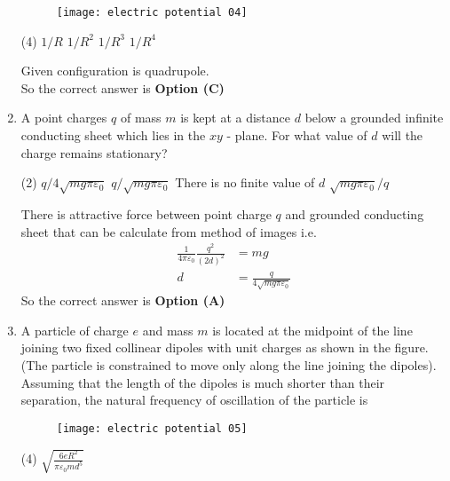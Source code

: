 \begin{enumerate}
	{}
	\begin{figure}[H]
		\centering
		\texttt{[image: electric potential 04]}
	\end{figure}
	\begin{tasks}(4)
		\task[\textbf{A.}] $1 / R$
		\task[\textbf{B.}] $1 / R^{2}$
		\task[\textbf{C.}] $1 / R^{3}$
		\task[\textbf{D.}] $1 / R^{4}$
	\end{tasks}
	\begin{answer}
		Given configuration is quadrupole.\\
		So the correct answer is \textbf{Option (C)}
	\end{answer}
	\item  A point charges $q$ of mass $m$ is kept at a distance $d$ below a grounded infinite conducting sheet which lies in the $x y$ - plane. For what value of $d$ will the charge remains stationary?
	{}
	\begin{tasks}(2)
		\task[\textbf{A.}] $q / 4 \sqrt{m g \pi \varepsilon_{0}}$
		\task[\textbf{B.}] $q / \sqrt{m g \pi \varepsilon_{0}}$
		\task[\textbf{C.}] There is no finite value of $d$
		\task[\textbf{D.}]  $\sqrt{m g \pi \varepsilon_{0}} / q$
	\end{tasks}
	\begin{answer}
		There is attractive force between point charge $q$ and grounded conducting sheet that can be calculate from method of images i.e.
		\begin{align*}
		\frac{1}{4 \pi \varepsilon_{0}} \frac{q^{2}}{(2 d)^{2}}&=m g \\ d&=\frac{q}{4 \sqrt{m g \pi \varepsilon_{0}}}
		\end{align*}
		So the correct answer is \textbf{Option (A)}
	\end{answer}
	\item A particle of charge $e$ and mass $m$ is located at the midpoint of the line joining two fixed collinear dipoles with unit charges as shown in the figure. (The particle is constrained to move only along the line joining the dipoles). Assuming that the length of the dipoles is much shorter than their separation, the natural frequency of oscillation of the particle is
	{}
	\begin{figure}[H]
		\centering
		\texttt{[image: electric potential 05]}
	\end{figure}
	\begin{tasks}(4)
		\task[\textbf{A.}] $\sqrt{\frac{6 e R^{2}}{\pi \varepsilon_{0} m d^{5}}}$

\end{tasks}
\end{enumerate}
